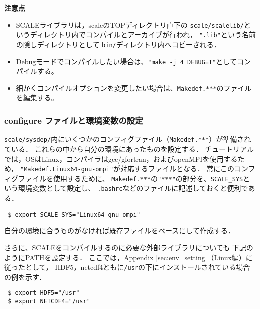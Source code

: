 {\bf 注意点}
\begin{itemize}
\item SCALEライブラリは，scaleのTOPディレクトリ直下の
 \verb|scale/scalelib/|というディレクトリ内でコンパイルとアーカイブが行われ，
 \verb|".lib"|という名前の隠しディレクトリとして
 \verb|bin/|ディレクトリ内へコピーされる．
\item Debugモードでコンパイルしたい場合は、\verb|"make -j 4 DEBUG=T"|としてコンパイルする。
\item 細かくコンパイルオプションを変更したい場合は、\verb|Makedef.***|のファイルを編集する。
\end{itemize}


\subsubsection{configure ファイルと環境変数の設定}

\verb|scale/sysdep/|内にいくつかのコンフィグファイル（\verb|Makedef.***|）が準備されている．
これらの中から自分の環境にあったものを設定する．
チュートリアルでは，OSはLinux，コンパイラはgcc/gfortran，およびopenMPIを使用するため，
\verb|"Makedef.Linux64-gnu-ompi"|が対応するファイルとなる．
常にこのコンフィグファイルを使用するために、
\verb|Makedef.***|の\verb|"***"|の部分を、\verb|SCALE_SYS|という環境変数として設定し、
\verb|.bashrc|などのファイルに記述しておくと便利である．
\begin{verbatim}
 $ export SCALE_SYS="Linux64-gnu-ompi"
\end{verbatim}
自分の環境に合うものがなければ既存ファイルをベースにして作成する．

さらに、SCALEをコンパイルするのに必要な外部ライブラリについても
下記のようにPATHを設定する．
ここでは，Appendix \ref{sec:env_setting}（Linux編）に従ったとして，
HDF5，netcdf4ともに\verb|/usr|の下にインストールされている場合の例を示す．
\begin{verbatim}
 $ export HDF5="/usr"
 $ export NETCDF4="/usr"
\end{verbatim}



